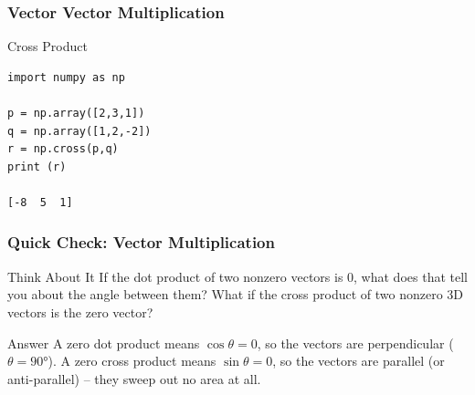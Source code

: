  \begin{frame}[fragile] \frametitle{Vector Vector Multiplication}

Cross Product
 
 \begin{lstlisting}
import numpy as np

p = np.array([2,3,1])
q = np.array([1,2,-2])
r = np.cross(p,q)
print (r)

[-8  5  1]
 \end{lstlisting}


\end{frame}

\begin{frame}[fragile]\frametitle{Quick Check: Vector Multiplication}
\begin{block}{Think About It}
If the dot product of two nonzero vectors is 0, what does that tell you about the angle between them? What if the cross product of two nonzero 3D vectors is the zero vector?
\end{block}
\pause
\begin{block}{Answer}
A zero dot product means $\cos\theta = 0$, so the vectors are perpendicular ($\theta = 90°$). A zero cross product means $\sin\theta = 0$, so the vectors are parallel (or anti-parallel) -- they sweep out no area at all.
\end{block}
\end{frame}






